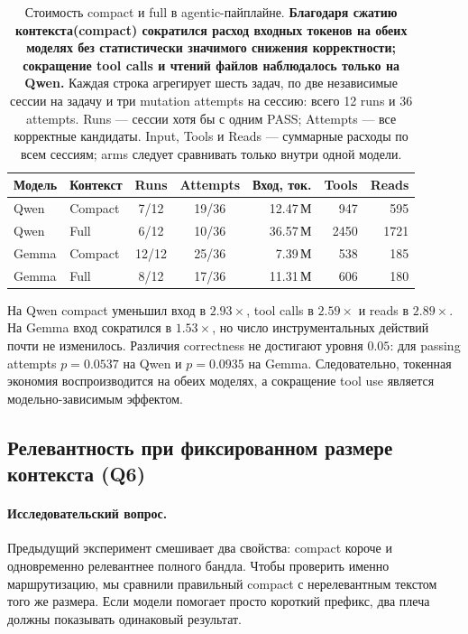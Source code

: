 \documentclass[10pt,a4paper]{article}
\begin{document}
\begin{table}[h]
\centering\footnotesize
\caption{Стоимость compact и full в agentic-пайплайне. \textbf{Благодаря сжатию контекста(compact) сократился расход входных токенов на обеих моделях без статистически значимого снижения корректности; сокращение tool calls и чтений файлов наблюдалось только на Qwen.} Каждая строка агрегирует шесть задач, по две независимые сессии на задачу и три mutation attempts на сессию: всего 12 runs и 36 attempts. Runs --- сессии хотя бы с одним PASS; Attempts --- все корректные кандидаты. Input, Tools и Reads --- суммарные расходы по всем сессиям; arms следует сравнивать только внутри одной модели.}
\label{tab:compact-agentic}
\begin{tabular}{llccrrr}
\toprule
Модель & Контекст & Runs & Attempts & Вход, ток. & Tools & Reads \\
\midrule
Qwen  & Compact         & 7/12  & 19/36 & 12.47\,М & 947  & 595 \\
Qwen  & Full & 6/12  & 10/36 & 36.57\,М & 2450 & 1721 \\
Gemma & Compact         & 12/12 & 25/36 & 7.39\,М  & 538  & 185 \\
Gemma & Full & 8/12  & 17/36 & 11.31\,М & 606  & 180 \\
\bottomrule
\end{tabular}
\end{table}

На Qwen compact уменьшил вход в $2.93\times$, tool calls в $2.59\times$ и
reads в $2.89\times$. На Gemma вход сократился в $1.53\times$, но число
инструментальных действий почти не изменилось. Различия correctness не
достигают уровня $0.05$: для passing attempts $p=0.0537$ на Qwen и
$p=0.0935$ на Gemma. Следовательно, токенная экономия воспроизводится на обеих
моделях, а сокращение tool use является модельно-зависимым эффектом.

\subsection{Релевантность при фиксированном размере контекста (Q6)}

\paragraph{Исследовательский вопрос.}
Предыдущий эксперимент смешивает два свойства: compact короче и одновременно
релевантнее полного бандла. Чтобы проверить именно маршрутизацию, мы сравнили
правильный compact с нерелевантным текстом того же размера. Если модели помогает
просто короткий префикс, два плеча должны показывать одинаковый результат.
\end{document}
